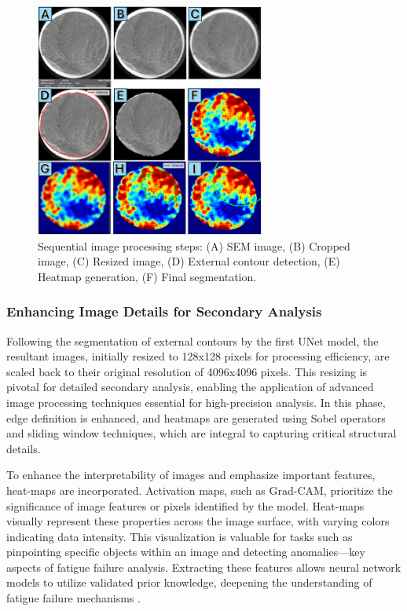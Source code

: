 \documentclass{ieeeaccess}
\begin{document}
\begin{figure}[!t]
  \centering
  \begin{minipage}{0.98\textwidth}
    \centering
    \includegraphics[width=0.672\textwidth]{figures/steps_dataset2.png}
    \caption{Sequential image processing steps: (A) SEM image, (B) Cropped image, (C) Resized image, (D) External contour detection, (E) Heatmap generation, (F) Final segmentation.}
    \label{steps}
  \end{minipage}
\end{figure}

\subsubsection{Enhancing Image Details for Secondary Analysis}
Following the segmentation of external contours by the first UNet model, the resultant images, initially resized to 128x128 pixels for processing efficiency, are scaled back to their original resolution of 4096x4096 pixels. This resizing is pivotal for detailed secondary analysis, enabling the application of advanced image processing techniques essential for high-precision analysis. In this phase, edge definition is enhanced, and heatmaps are generated using Sobel operators and sliding window techniques, which are integral to capturing critical structural details.

To enhance the interpretability of images and emphasize important features, heat-maps are incorporated. Activation maps, such as Grad-CAM, prioritize the significance of image features or pixels identified by the model. Heat-maps visually represent these properties across the image surface, with varying colors indicating data intensity. This visualization is valuable for tasks such as pinpointing specific objects within an image and detecting anomalies—key aspects of fatigue failure analysis. Extracting these features allows neural network models to utilize validated prior knowledge, deepening the understanding of fatigue failure mechanisms \cite{selvaraju2017grad}.
\end{document}
